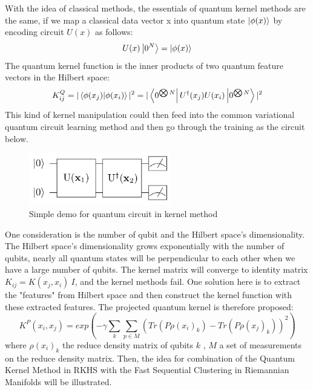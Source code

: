 \documentclass{article}
\begin{document}
With the idea of classical methods, the essentials of 
quantum kernel methods are the same, if we map a 
classical data vector x into quantum state $\ket{\phi(x)}$
by encoding circuit $U(x)$ as follows:
\begin{equation}
  U(x) \ket{0^{N}} = \ket{\phi(x)}
\end{equation}
The quantum kernel function is the inner products of 
two quantum feature vectors in the Hilbert space:
\begin{equation}
  K^Q_{ij} = |\bra{\phi(x_j)} \ket{\phi(x_i) }|^2 = |\bra{0^{\bigotimes N}} U^{\dagger}(x_j) U(x_i) \ket{ 0^{\bigotimes N }} |^2
\end{equation}
This kind of kernel manipulation could then feed into 
the common variational quantum circuit learning method 
and then go through the training as the circuit below. 
\begin{figure}[h]
  \begin{center}
    \includegraphics[width=0.55\textwidth]{kernel.png}    
  \end{center}
  \caption{Simple demo for quantum circuit in kernel method}
\end{figure}
One consideration is the number of 
qubit and the Hilbert space's dimensionality. 
The Hilbert space's dimensionality grows exponentially 
with the number of qubits, nearly all quantum states
will be perpendicular to each other when we have a large 
number of qubits. The kernel matrix will converge 
to identity matrix $K_{ij} = K(x_j,x_i) ~ I$, 
and the kernel methods fail. One solution here is 
to extract the "features" from Hilbert space and 
then construct the kernel function with 
these extracted features. The projected quantum 
kernel is therefore proposed: 
\begin{equation}
  K^P (x_i,x_j) = exp(-\gamma \sum_k \sum_{p \in M} 
  (Tr(P \rho(x_i)_k)-Tr(P \rho(x_j)_k))^2)
\end{equation}
where $\rho(x_i)_k$ the reduce density matrix of 
qubits $k$ , $M$ a set of measurements on 
the reduce density matrix. Then, the idea for combination of 
the Quantum Kernel Method in RKHS with the
Fast Sequential Clustering in Riemannian Manifolds will be 
illustrated.
\end{document}

